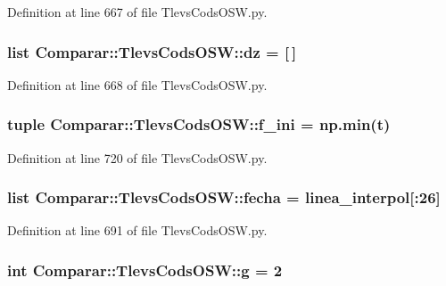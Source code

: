 \-Definition at line 667 of file \-Tlevs\-Cods\-O\-S\-W.\-py.

\subsubsection[{dz}]{\setlength{\rightskip}{0pt plus 5cm}list {\bf \-Comparar\-::\-Tlevs\-Cods\-O\-S\-W\-::dz} = [$\,$]}\label{namespace_comparar_1_1_tlevs_cods_o_s_w_a082b1f8c817120b5d9d9ae363ea10729}


\-Definition at line 668 of file \-Tlevs\-Cods\-O\-S\-W.\-py.

\subsubsection[{f\-\_\-ini}]{\setlength{\rightskip}{0pt plus 5cm}tuple {\bf \-Comparar\-::\-Tlevs\-Cods\-O\-S\-W\-::f\-\_\-ini} = np.\-min({\bf t})}\label{namespace_comparar_1_1_tlevs_cods_o_s_w_a383f7c9987353b1748212a0b1bf3b902}


\-Definition at line 720 of file \-Tlevs\-Cods\-O\-S\-W.\-py.

\subsubsection[{fecha}]{\setlength{\rightskip}{0pt plus 5cm}list {\bf \-Comparar\-::\-Tlevs\-Cods\-O\-S\-W\-::fecha} = {\bf linea\-\_\-interpol}[\-:26]}\label{namespace_comparar_1_1_tlevs_cods_o_s_w_a102df5f7aed3ecdf411aaac705734a66}


\-Definition at line 691 of file \-Tlevs\-Cods\-O\-S\-W.\-py.

\subsubsection[{g}]{\setlength{\rightskip}{0pt plus 5cm}int {\bf \-Comparar\-::\-Tlevs\-Cods\-O\-S\-W\-::g} = 2}\label{namespace_comparar_1_1_tlevs_cods_o_s_w_a449cb974121e81b552d6db4a153b09d5}


